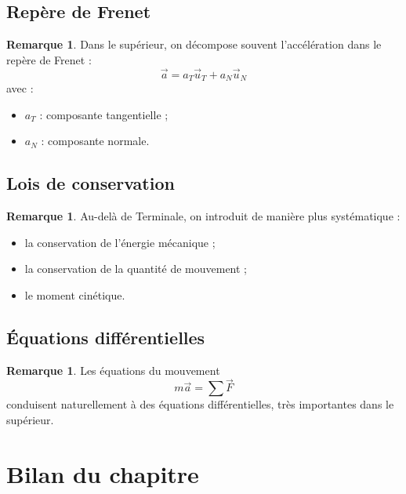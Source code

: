 \documentclass[11pt,a4paper]{article}
\theoremstyle{definition}
\newtheorem{remarque}[definition]{Remarque}
\theoremstyle{plain}
\theoremstyle{remark}
\begin{document}
\subsection{Repère de Frenet}

\begin{remarque}
Dans le supérieur, on décompose souvent l'accélération dans le repère de Frenet :
\[
\vec{a}=a_T\vec{u}_T+a_N\vec{u}_N
\]
avec :
\begin{itemize}
    \item $a_T$ : composante tangentielle ;
    \item $a_N$ : composante normale.
\end{itemize}
\end{remarque}

\subsection{Lois de conservation}

\begin{remarque}
Au-delà de Terminale, on introduit de manière plus systématique :
\begin{itemize}
    \item la conservation de l'énergie mécanique ;
    \item la conservation de la quantité de mouvement ;
    \item le moment cinétique.
\end{itemize}
\end{remarque}

\subsection{Équations différentielles}

\begin{remarque}
Les équations du mouvement
\[
m\vec{a}=\sum \vec{F}
\]
conduisent naturellement à des équations différentielles, très importantes dans le supérieur.
\end{remarque}

\section{Bilan du chapitre}
\end{document}
